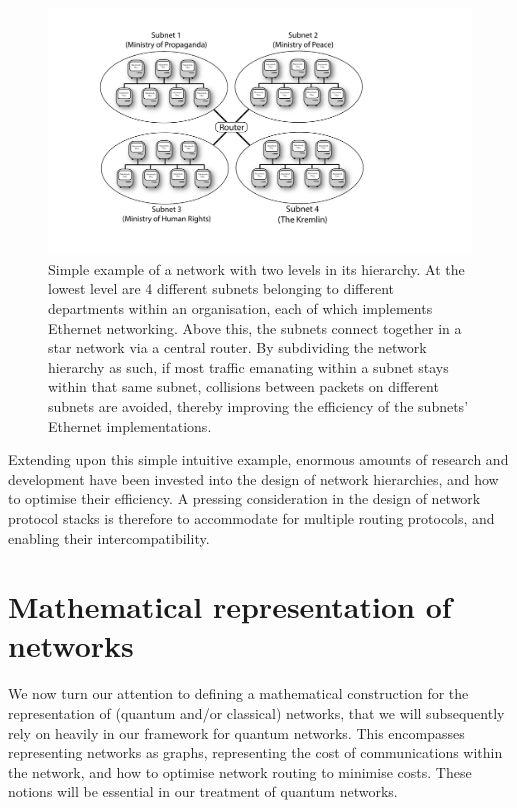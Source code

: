 \documentclass[aps,rmp,twocolumn,amsmath,amssymb,nofootinbib,superscriptaddress,longbibliography,floatfix,table-of-contents,eqsecnum]{revtex4-1}
\begin{document}
\begin{figure}[!htb]
	\includegraphics[width=\columnwidth]{network_hierarchy}
	\caption{Simple example of a network with two levels in its hierarchy. At the lowest level are 4 different subnets belonging to different departments within an organisation, each of which implements Ethernet networking. Above this, the subnets connect together in a star network via a central router. By subdividing the network hierarchy as such, if most traffic emanating within a subnet stays within that same subnet, collisions between packets on different subnets are avoided, thereby improving the efficiency of the subnets' Ethernet implementations.} \label{fig:net_hierarchy}
\end{figure}

Extending upon this simple intuitive example, enormous amounts of research and development have been invested into the design of network hierarchies, and how to optimise their efficiency. A pressing consideration in the design of network protocol stacks is therefore to accommodate for multiple routing protocols, and enabling their intercompatibility.

%
%

\section{Mathematical representation of networks}

We now turn our attention to defining a mathematical construction for the representation of (quantum and/or classical) networks, that we will subsequently rely on heavily in our framework for quantum networks. This encompasses representing networks as graphs, representing the cost of communications within the network, and how to optimise network routing to minimise costs.  These notions will be essential in our treatment of quantum networks.
\end{document}
